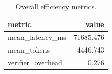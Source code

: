\begin{table}[t]
\centering
\begin{tabular}{lr}
\toprule
metric & value \\
\midrule
mean\_latency\_ms & 71685.476 \\
mean\_tokens & 4446.743 \\
verifier\_overhead & 0.276 \\
\bottomrule
\end{tabular}
\caption{Overall efficiency metrics.}
\label{tab:efficiency}
\end{table}
